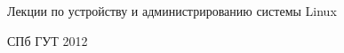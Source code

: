 \begin{titlepage}
\newpage

\begin{center}
\Large Лекции по устройству и администрированию системы Linux
\end{center}

\begin{center}
СПб ГУТ 2012
\end{center}

\end{titlepage}
